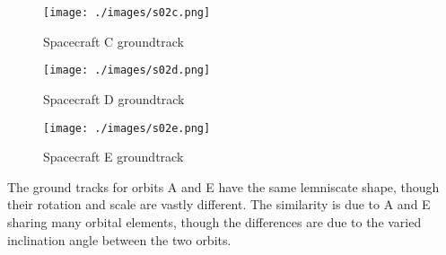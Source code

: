 \begin{hwkProblem}{2}{}
	

	\hwkPart

	\begin{figure}[H]
		\begin{center}
			\texttt{[image: ./images/s02c.png]}
		\end{center}
		\caption{Spacecraft C groundtrack}\label{fig:s02c}
	\end{figure}

	

	\hwkPart

	\begin{figure}[H]
		\begin{center}
			\texttt{[image: ./images/s02d.png]}
		\end{center}
		\caption{Spacecraft D groundtrack}\label{fig:s02d}
	\end{figure}

	

	\hwkPart

	\begin{figure}[H]
		\begin{center}
			\texttt{[image: ./images/s02e.png]}
		\end{center}
		\caption{Spacecraft E groundtrack}\label{fig:s02e}
	\end{figure}

	

	\hwkPart

	The ground tracks for orbits A and E have the same lemniscate shape, though their rotation and scale are vastly different. The similarity is due to A and E sharing many orbital elements, though the differences are due to the varied inclination angle between the two orbits.

\end{hwkProblem}
